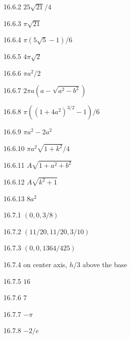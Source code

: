 \begin{Answer}{16.6.2}
	$25\sqrt{21}/4$
\end{Answer}
\begin{Answer}{16.6.3}
	$\pi\sqrt{21}$
\end{Answer}
\begin{Answer}{16.6.4}
	$\pi(5\sqrt5-1)/6$
\end{Answer}
\begin{Answer}{16.6.5}
	$4\pi\sqrt2$
\end{Answer}
\begin{Answer}{16.6.6}
	$\pi a^2/2$
\end{Answer}
\begin{Answer}{16.6.7}
	$2\pi a(a-\sqrt{a^2-b^2})$
\end{Answer}
\begin{Answer}{16.6.8}
	$\pi((1+4a^2)^{3/2}-1)/6$
\end{Answer}
\begin{Answer}{16.6.9}
	$\pi a^2-2a^2$
\end{Answer}
\begin{Answer}{16.6.10}
	$\pi a^2\sqrt{1+k^2}/4$
\end{Answer}
\begin{Answer}{16.6.11}
	$A\sqrt{1+a^2+b^2}$
\end{Answer}
\begin{Answer}{16.6.12}
	$A\sqrt{k^2+1}$
\end{Answer}
\begin{Answer}{16.6.13}
	$8a^2$
\end{Answer}
\begin{Answer}{16.7.1}
	$(0,0,3/8)$
\end{Answer}
\begin{Answer}{16.7.2}
	$(11/20,11/20,3/10)$
\end{Answer}
\begin{Answer}{16.7.3}
	$(0,0,1364/425)$
\end{Answer}
\begin{Answer}{16.7.4}
	on center axis, $h/3$ above the base
\end{Answer}
\begin{Answer}{16.7.5}
	$16$
\end{Answer}
\begin{Answer}{16.7.6}
	$7$
\end{Answer}
\begin{Answer}{16.7.7}
	$-\pi$
\end{Answer}
\begin{Answer}{16.7.8}
	$-2/e$
\end{Answer}
